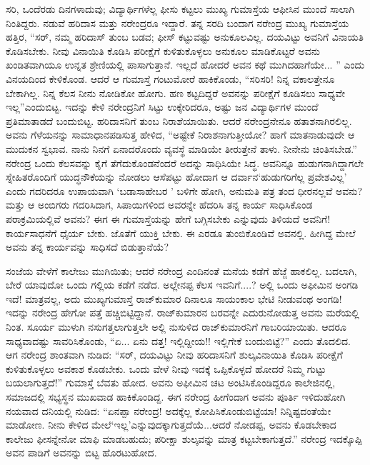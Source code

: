 ಸರಿ, ಒಂದೆರಡು ದಿನಗಳಾದುವು; ವಿದ್ಯಾರ್ಥಿಗಳೆಲ್ಲ ಫೀಸು ಕಟ್ಟಲು ಮುಖ್ಯ ಗುಮಾಸ್ತೆಯ ಆಫೀಸಿನ ಮುಂದೆ ಸಾಲಾಗಿ ನಿಂತಿದ್ದರು. ನಡುವೆ ಹರಿದಾಸ ಮತ್ತು ನರೇಂದ್ರರೂ ಇದ್ದಾರೆ. ತನ್ನ ಸರದಿ ಬಂದಾಗ ನರೇಂದ್ರ ಮುಖ್ಯ ಗುಮಾಸ್ತೆಯ ಹತ್ತಿರ, “ಸರ್, ನಮ್ಮ ಹರಿದಾಸ್ ತುಂಬ ಬಡವ; ಫೀಸ್ ಕಟ್ಟುವಷ್ಟು ಅನುಕೂಲವಿಲ್ಲ. ದಯವಿಟ್ಟು ಅವನಿಗೆ ವಿನಾಯತಿ ಕೊಡಿಸಬೇಕು. ನೀವು ವಿನಾಯಿತಿ ಕೊಡಿಸಿ ಪರೀಕ್ಷೆಗೆ ಕುಳಿತುಕೊಳ್ಳಲು ಅನುಕೂಲ ಮಾಡಿಕೊಟ್ಟರೆ ಅವನು ಖಂಡಿತವಾಗಿಯೂ ಉನ್ನತ ಶ್ರೇಣಿಯಲ್ಲಿ ಪಾಸಾಗುತ್ತಾನೆ. ಇಲ್ಲದೆ ಹೋದರೆ ಅವನ ಕಥೆ ಮುಗಿದಹಾಗೆಯೇ... ” ಎಂದು ವಿನಯದಿಂದ ಕೇಳಿಕೊಂಡ. ಆದರೆ ಆ ಗುಮಾಸ್ತೆ ಗಂಟುಮೋರೆ ಹಾಕಿಕೊಂಡು, “ಸರಿಸರಿ! ನಿನ್ನ ವಕಾಲತ್ತೇನೂ ಬೇಕಾಗಿಲ್ಲ. ನಿನ್ನ ಕೆಲಸ ನೀನು ನೋಡಿಕೋ ಹೋಗು. ಹಣ ಕಟ್ಟದಿದ್ದರೆ ಅವನನ್ನು ಪರೀಕ್ಷೆಗೆ ಕೂಡಿಸಲು ಸಾಧ್ಯವೇ ಇಲ್ಲ”ಎಂದುಬಿಟ್ಟ. ಇದನ್ನು ಕೇಳಿ ನರೇಂದ್ರನಿಗೆ ಸಿಟ್ಟು ಉಕ್ಕೇರಿದರೂ, ಅಷ್ಟು ಜನ ವಿದ್ಯಾರ್ಥಿಗಳ ಮುಂದೆ ಪ್ರತಿಮಾತಾಡದೆ ಬಂದುಬಿಟ್ಟ. ಹರಿದಾಸನಿಗೆ ತುಂಬ ನಿರಾಶೆಯಾಯಿತು. ಆದರೆ ನರೇಂದ್ರನೇನೂ ಹತಾಶನಾಗಿರಲಿಲ್ಲ. ಅವನು ಗೆಳೆಯನನ್ನು ಸಾಮಾಧಾನಪಡಿಸುತ್ತ ಹೇಳಿದ, “ಅಷ್ಟೇಕೆ ನಿರಾಶನಾಗುತ್ತೀಯೋ? ಹಾಗೆ ಮಾತನಾಡುವುದೇ ಆ ಮುದುಕನ ಸ್ವಭಾವ. ನಾನು ನಿನಗೆ ಏನಾದರೊಂದು ವ್ಯವಸ್ಥೆ ಮಾಡಿಯೇ ತೀರುತ್ತೇನೆ ತಾಳು. ನೀನೇನು ಚಿಂತಿಸಬೇಡ.” ನರೇಂದ್ರ ಒಂದು ಕೆಲಸವನ್ನು ಕೈಗೆ ತೆಗೆದುಕೊಂಡನೆಂದರೆ ಅದನ್ನು ಸಾಧಿಸಿಯೇ ಸಿದ್ಧ. ಅವನಿನ್ನೂ ಹುಡುಗನಾಗಿದ್ದಾಗಲೇ ಸ್ನೇಹಿತರೊಂದಿಗೆ ಯುದ್ಧನೌಕೆಯನ್ನು ನೋಡಲು ಆಸೆಪಟ್ಟು ಹೋದಾಗ ಆ ದರ್ವಾನ‘ಹುಡುಗರಿಗೆಲ್ಲ ಪ್ರವೇಶವಿಲ್ಲ’ ಎಂದು ಗದರಿದರೂ ಉಪಾಯವಾಗಿ ‘ಬಡಾಸಾಹೇಬರ ’ ಬಳಿಗೇ ಹೋಗಿ, ಅನುಮತಿ ಪತ್ರ ತಂದ ಧೀರನಲ್ಲವೆ ಅವನು? ಮತ್ತು ಆ ಅಂಬಿಗರು ಗದರಿಸಿದಾಗ, ಸಿಪಾಯಿಗಳಿಂದ ಅವರನ್ನೇ ಹೆದರಿಸಿ ತನ್ನ ಕಾರ್ಯ ಸಾಧಿಸಿಕೊಂಡ ಪರಾಕ್ರಮಿಯಲ್ಲಿವೆ ಅವನು? ಈಗ ಈ ಗುಮಾಸ್ತೆಯನ್ನು ಹೇಗೆ ಬಗ್ಗಿಸಬೇಕು ಎನ್ನುವುದು ತಿಳಿಯದೆ ಅವನಿಗೆ! ಕಾರ್ಯಸಾಧನೆಗೆ ಧೈರ್ಯ ಬೇಕು. ಜೊತೆಗೆ ಯುಕ್ತಿ ಬೇಕು. ಈ ಎರಡೂ ತುಂಬಿಕೊಂಡಿವೆ ಅವನಲ್ಲಿ. ಹೀಗಿದ್ದ ಮೇಲೆ ಅವನು ತನ್ನ ಕಾರ್ಯವನ್ನು ಸಾಧಿಸದೆ ಬಿಡುತ್ತಾನೆಯೆ?

ಸಂಜೆಯ ವೇಳೆಗೆ ಕಾಲೇಜು ಮುಗಿಯಿತು; ಆದರೆ ನರೇಂದ್ರ ಎಂದಿನಂತೆ ಮನೆಯ ಕಡೆಗೆ ಹೆಜ್ಜೆ ಹಾಕಲಿಲ್ಲ. ಬದಲಾಗಿ, ಬೇರೆ ಯಾವುದೋ ಒಂದು ಗಲ್ಲಿಯ ಕಡೆಗೆ ನಡೆದ. ಅಲ್ಲೇನಪ್ಪ ಕೆಲಸ ಇವನಿಗೆ....? ಅಲ್ಲಿ ಒಂದು ಅಫೀಮಿನ ಅಂಗಡಿ ಇದೆ! ಮಾತ್ರವಲ್ಲ, ಅದು ಮುಖ್ಯಗುಮಾಸ್ತೆ ರಾಜ್​ಕುಮಾರ ದಿನಾಲೂ ಸಾಯಂಕಾಲ ಭೇಟಿ ನೀಡುವಂಥ ಅಂಗಡಿ! ಇದನ್ನು ನರೇಂದ್ರ ಹೇಗೋ ಪತ್ತೆ ಹಚ್ಚಿಬಿಟ್ಟಿದ್ದಾನೆ. ರಾಜ್​ಕುಮಾರನ ಬರವನ್ನೇ ಎದುರುನೋಡುತ್ತ ಅವನು ಮರೆಯಲ್ಲಿ ನಿಂತ. ಸೂರ್ಯ ಮುಳುಗಿ ನಸುಗತ್ತಲಾಗುತ್ತಲೇ ಅಲ್ಲಿ ನುಸುಳಿದ ರಾಜ್​ಕುಮಾರನಿಗೆ ಗಾಬರಿಯಾಯಿತು. ಆದರೂ ಸಾಧ್ಯವಾದಷ್ಟು ಸಾವರಿಸಿಕೊಂಡು, “ಏ... ಏನು ದತ್ತ! ಇಲ್ಲಿದ್ದೀಯ!! ಇಲ್ಲಿಗೇಕೆ ಬಂದುಬಿಟ್ಟೆ?” ಎಂದು ತೊದಲಿದ. ಆಗ ನರೇಂದ್ರ ಶಾಂತವಾಗಿ ನುಡಿದ: “ಸರ್, ದಯವಿಟ್ಟು ನೀವು ಹರಿದಾಸನಿಗೆ ಶುಲ್ಕವಿನಾಯಿತಿ ಕೊಡಿಸಿ ಪರೀಕ್ಷೆಗೆ ಕುಳಿತುಕೊಳ್ಳಲು ಅವಕಾಶ ಕೊಡಬೇಕು. ಒಂದು ವೇಳೆ ನೀವು ಇದಕ್ಕೆ ಒಪ್ಪಿಕೊಳ್ಳದೆ ಹೋದರೆ ನಿಮ್ಮ ಗುಟ್ಟು ಬಯಲಾಗುತ್ತದೆ!” ಗುಮಾಸ್ತೆ ಬೆವತು ಹೋದ. ಅವನು ಅಫೀಮಿನ ಚಟ ಅಂಟಿಸಿಕೊಂಡಿದ್ದರೂ ಕಾಲೇಜಿನಲ್ಲಿ, ಸಮಾಜದಲ್ಲಿ ಸಭ್ಯಸ್ಥನ ಮುಖವಾಡ ಹಾಕಿಕೊಂಡಿದ್ದ. ಈಗ ನರೇಂದ್ರ ಹೀಗೆಂದಾಗ ಅವನು ಪೂರ್ತಿ ಇಳಿದುಹೋಗಿ ನಯವಾದ ದನಿಯಲ್ಲಿ ನುಡಿದ: “ಏನಪ್ಪಾ ನರೇಂದ್ರ! ಅದಕ್ಕೆಲ್ಲ ಕೋಪಿಸಿಕೊಂಡುಬಿಟ್ಟೆಯಾ! ನಿನ್ನಿಷ್ಟದಂತೆಯೇ ಮಾಡೋಣ. ನೀನು ಕೇಳಿದ ಮೇಲೆ‘ಇಲ್ಲ’ಎನ್ನುವುದಕ್ಕಾಗುತ್ತದೆಯೆ...ಆದರೆ ನೋಡಪ್ಪ, ಅವನು ಕೊಡಬೇಕಾದ ಕಾಲೇಜು ಫೀಸನ್ನೇನೋ ಮಾಫಿ ಮಾಡಬಹುದು; ಪರೀಕ್ಷಾ ಶುಲ್ಕವನ್ನು ಮಾತ್ರ ಕಟ್ಟಬೇಕಾಗುತ್ತದೆ.” ನರೇಂದ್ರ ಇದಕ್ಕೊಪ್ಪಿ ಅವನ ಪಾಡಿಗೆ ಅವನನ್ನು ಬಿಟ್ಟ ಹೊರಟುಹೋದ.

